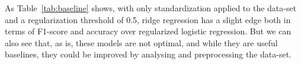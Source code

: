 \documentclass[10pt,conference,compsocconf]{IEEEtran}
\begin{document}
\begin{comment}
\begin{table}[ht]
\centering
\resizebox{\columnwidth}{!}{%
\begin{tabular}{lrrr|r|r|r|}
\cline{5-7}
 &
  \multicolumn{1}{c}{} &
  \multicolumn{1}{l}{} &
  \multicolumn{1}{l|}{} &
  \multicolumn{1}{l|}{Training} &
  \multicolumn{1}{l|}{Validation} &
  \multicolumn{1}{l|}{Testing} \\ \cline{2-7} 
\multicolumn{1}{l|}{} &
  \multicolumn{3}{c|}{Parameters} &
  \multicolumn{1}{l|}{F1-score} &
  \multicolumn{1}{l|}{F1-score} &
  \multicolumn{1}{l|}{F1-score} \\ \hline
\multicolumn{1}{|l|}{Methods} &
  \multicolumn{1}{l|}{Gamma} &
  \multicolumn{1}{l|}{Lambda} &
  \multicolumn{1}{l|}{Max\_iters} &
  \multicolumn{1}{l|}{Accuracy} &
  \multicolumn{1}{l|}{Accuracy} &
  \multicolumn{1}{l|}{Accuracy} \\ \hline
\multicolumn{1}{|l|}{\multirow{2}{*}{\begin{tabular}[c]{@{}l@{}}Regularized logistic \\ regression\end{tabular}}} &
  \multicolumn{1}{r|}{0.4} &
  \multicolumn{1}{r|}{5e-2} &
  6000 &
  44.79\% &
  44.80\% &
  44.90\% \\
\multicolumn{1}{|l|}{} &
  \multicolumn{1}{r|}{} &
  \multicolumn{1}{r|}{} &
   &
  72.80\% &
  72.80\% &
  72.90\% \\ \hline
\multicolumn{1}{|l|}{\multirow{2}{*}{Ridge Regression}} &
  \multicolumn{1}{r|}{-} &
  \multicolumn{1}{r|}{1e-4} &
  - &
  56.70\% &
  56.70\% &
  56.70\% \\
\multicolumn{1}{|l|}{} &
  \multicolumn{1}{r|}{} &
  \multicolumn{1}{r|}{} &
   &
  74.43\% &
  74.42\% &
  74.40\% \\ \hline
\end{tabular}%
}
\caption{Parameters, F1-score and accuracy results for the initial implementation
using the entire data-set.}
\label{tab:baseline}
\end{table}
\end{comment}

As Table~\ref{tab:baseline} shows, with only standardization applied to 
the data-set and a regularization threshold of 0.5, ridge regression has 
a slight edge both in terms of F1-score and accuracy over regularized 
logistic regression.
But we can also see that, as is, these models are not optimal, and while 
they are useful baselines, they could be improved by analysing and 
preprocessing the data-set.
\end{document}
